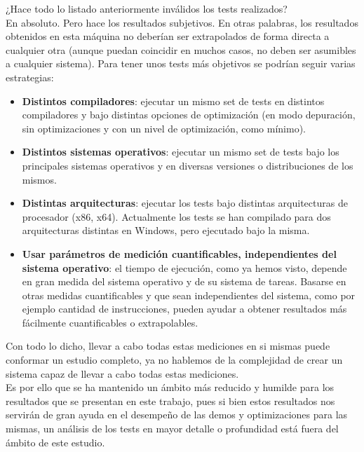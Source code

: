 ¿Hace todo lo listado anteriormente inválidos los tests realizados?\\

En absoluto. Pero hace los resultados subjetivos. En otras palabras, los resultados obtenidos en esta máquina no deberían ser extrapolados de forma directa a cualquier otra (aunque puedan coincidir en muchos casos, no deben ser asumibles a cualquier sistema). Para tener unos tests más objetivos se podrían seguir varias estrategias:

\begin{itemize}
	\item \textbf{Distintos compiladores}: ejecutar un mismo set de tests en distintos compiladores y bajo distintas opciones de optimización (en modo depuración, sin optimizaciones y con un nivel de optimización, como mínimo).
	\item \textbf{Distintos sistemas operativos}: ejecutar un mismo set de tests bajo los principales sistemas operativos y en diversas versiones o distribuciones de los mismos.
	\item \textbf{Distintas arquitecturas}: ejecutar los tests bajo distintas arquitecturas de procesador (x86, x64). Actualmente los tests se han compilado para dos arquitecturas distintas en Windows, pero ejecutado bajo la misma.
	\item \textbf{Usar parámetros de medición cuantificables, independientes del sistema operativo}: el tiempo de ejecución, como ya hemos visto, depende en gran medida del sistema operativo y de su sistema de tareas. Basarse en otras medidas cuantificables y que sean independientes del sistema, como por ejemplo cantidad de instrucciones, pueden ayudar a obtener resultados más fácilmente cuantificables o extrapolables.
\end{itemize} 

Con todo lo dicho, llevar a cabo todas estas mediciones en si mismas puede conformar un estudio completo, ya no hablemos de la complejidad de crear un sistema capaz de llevar a cabo todas estas mediciones.\\

Es por ello que se ha mantenido un ámbito más reducido y humilde para los resultados que se presentan en este trabajo, pues si bien estos resultados nos servirán de gran ayuda en el desempeño de las demos y optimizaciones para las mismas, un análisis de los tests en mayor detalle o profundidad está fuera del ámbito de este estudio.
